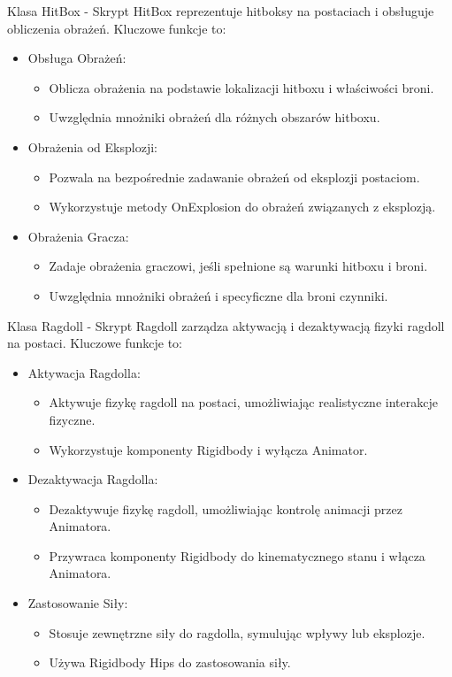 Klasa HitBox -
Skrypt HitBox reprezentuje hitboksy na postaciach i obsługuje obliczenia obrażeń. Kluczowe funkcje to:
\begin{itemize}
\item Obsługa Obrażeń:
    \begin{itemize}
        \item Oblicza obrażenia na podstawie lokalizacji hitboxu i właściwości broni.
        \item Uwzględnia mnożniki obrażeń dla różnych obszarów hitboxu.
    \end{itemize}
\item Obrażenia od Eksplozji:
    \begin{itemize}
        \item Pozwala na bezpośrednie zadawanie obrażeń od eksplozji postaciom.
        \item Wykorzystuje metody OnExplosion do obrażeń związanych z eksplozją.
    \end{itemize}
\item Obrażenia Gracza:
    \begin{itemize}
        \item Zadaje obrażenia graczowi, jeśli spełnione są warunki hitboxu i broni.
        \item Uwzględnia mnożniki obrażeń i specyficzne dla broni czynniki.
    \end{itemize}
\end{itemize}

Klasa Ragdoll -
Skrypt Ragdoll zarządza aktywacją i dezaktywacją fizyki ragdoll na postaci. Kluczowe funkcje to:
\begin{itemize}
\item Aktywacja Ragdolla:
    \begin{itemize}
        \item Aktywuje fizykę ragdoll na postaci, umożliwiając realistyczne interakcje fizyczne.
        \item Wykorzystuje komponenty Rigidbody i wyłącza Animator.
    \end{itemize}
\item Dezaktywacja Ragdolla:
    \begin{itemize}
        \item Dezaktywuje fizykę ragdoll, umożliwiając kontrolę animacji przez Animatora.
        \item Przywraca komponenty Rigidbody do kinematycznego stanu i włącza Animatora.
    \end{itemize}
\item Zastosowanie Siły:
    \begin{itemize}
        \item Stosuje zewnętrzne siły do ragdolla, symulując wpływy lub eksplozje.
        \item Używa Rigidbody Hips do zastosowania siły.
    \end{itemize}
\end{itemize}


